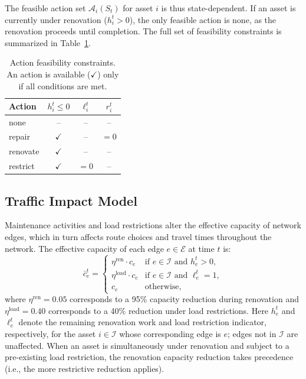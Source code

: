 \documentclass[3p, twocolumn]{elsarticle}
\begin{document}
The feasible action set $\mathcal{A}_i(S_t)$ for asset $i$ is thus state-dependent. If an asset is currently under renovation ($h_i^t > 0$), the only feasible action is \textsf{none}, as the renovation proceeds until completion. The full set of feasibility constraints is summarized in Table~\ref{tab:action_feasibility}.

\begin{table}[htpb]
\centering
\caption{Action feasibility constraints. An action is available ($\checkmark$) only if all conditions are met.}
\label{tab:action_feasibility}
\small
\begin{tabular}{lccc}
\hline
\textbf{Action} & $h_i^t \leq 0$ & $\ell_i^t$ & $r_i^t$ \\
\hline
\textsf{none}       & --           & -- & -- \\
\textsf{repair}     & $\checkmark$ & -- & $= 0$ \\
\textsf{renovate}   & $\checkmark$ & -- & -- \\
\textsf{restrict}   & $\checkmark$ & $= 0$ & -- \\
\hline
\end{tabular}
\end{table}


\subsection{Traffic Impact Model}
\label{subsec:traffic}

Maintenance activities and load restrictions alter the effective capacity of network edges, which in turn affects route choices and travel times throughout the network. The effective capacity of each edge $e \in \mathcal{E}$ at time $t$ is:
\begin{equation}
    \bar{c}_e^t = 
    \begin{cases}
        \eta^{\text{ren}} \cdot c_e & \text{if } e \in \mathcal{I} \text{ and } h_e^t > 0, \\
        \eta^{\text{load}} \cdot c_e & \text{if } e \in \mathcal{I} \text{ and } \ell_e^t = 1, \\
        c_e & \text{otherwise},
    \end{cases}
    \label{eq:capacity}
\end{equation}
where $\eta^{\text{ren}} = 0.05$ corresponds to a 95\% capacity reduction during renovation and $\eta^{\text{load}} = 0.40$ corresponds to a 40\% reduction under load restrictions. Here $h_e^t$ and $\ell_e^t$ denote the remaining renovation work and load restriction indicator, respectively, for the asset $i \in \mathcal{I}$ whose corresponding edge is $e$; edges not in $\mathcal{I}$ are unaffected. When an asset is simultaneously under renovation and subject to a pre-existing load restriction, the renovation capacity reduction takes precedence (i.e., the more restrictive reduction applies).
\end{document}
